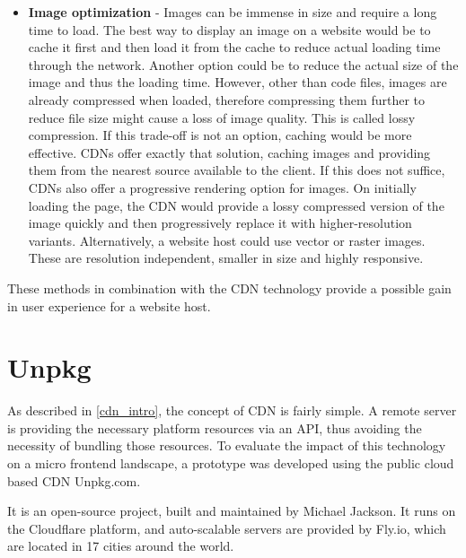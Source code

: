 \begin{itemize}
	\item \textbf{Image optimization} - Images can be immense in size and require a long time to load. The best way to display an image on a website would be to cache it first and then load it from the cache to reduce actual loading time through the network. Another option could be to reduce the actual size of the image and thus the loading time.
	However, other than code files, images are already compressed when loaded, therefore compressing them further to reduce file size might cause a loss of image quality. This is called lossy compression. If this trade-off is not an option, caching would be more effective.
	CDNs offer exactly that solution, caching images and providing them from the nearest source available to the client. If this does not suffice, CDNs also offer a progressive rendering option for images. On initially loading the page, the CDN would provide a lossy compressed version of the image quickly and then progressively replace it with higher-resolution variants.
	Alternatively, a website host could use vector or raster images. These are resolution independent, smaller in size and highly responsive.\cite{cdn_fe_opt_img_opt}
\end{itemize}

These methods in combination with the CDN technology provide a possible gain in user experience for a website host. \cite{cdn_fe_opt}
\section{Unpkg}

As described in \ref{cdn_intro}, the concept of CDN is fairly simple. A remote server is providing the necessary platform resources via an API, thus avoiding the necessity of bundling those resources.
To evaluate the impact of this technology on a micro frontend landscape, a prototype was developed using the public cloud based CDN Unpkg.com.

It is an open-source project, built and maintained by Michael Jackson. It runs on the Cloudflare platform, and auto-scalable servers are provided by Fly.io, which are located in 17 cities around the world.\cite{unpkg_doc}

